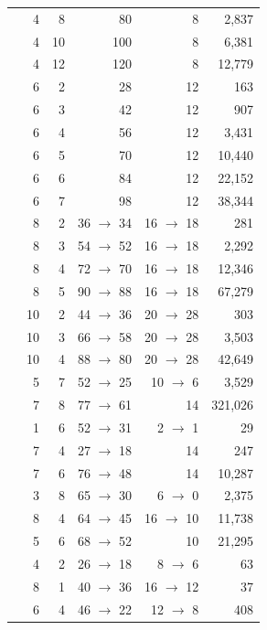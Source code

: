 \begin{longtable}{@{}L{4.4cm} r r r r r@{}}
\addlinespace[2pt]
 & 4 & 8 & 80 & 8 & 2,837 \\
 & 4 & 10 & 100 & 8 & 6,381 \\
 & 4 & 12 & 120 & 8 & 12,779 \\
 & 6 & 2 & 28 & 12 & 163 \\
 & 6 & 3 & 42 & 12 & 907 \\
 & 6 & 4 & 56 & 12 & 3,431 \\
 & 6 & 5 & 70 & 12 & 10,440 \\
 & 6 & 6 & 84 & 12 & 22,152 \\
 & 6 & 7 & 98 & 12 & 38,344 \\
 & 8 & 2 & 36 $\to$ 34 & 16 $\to$ 18 & 281 \\
 & 8 & 3 & 54 $\to$ 52 & 16 $\to$ 18 & 2,292 \\
 & 8 & 4 & 72 $\to$ 70 & 16 $\to$ 18 & 12,346 \\
 & 8 & 5 & 90 $\to$ 88 & 16 $\to$ 18 & 67,279 \\
 & 10 & 2 & 44 $\to$ 36 & 20 $\to$ 28 & 303 \\
 & 10 & 3 & 66 $\to$ 58 & 20 $\to$ 28 & 3,503 \\
 & 10 & 4 & 88 $\to$ 80 & 20 $\to$ 28 & 42,649 \\
 & 5 & 7 & 52 $\to$ 25 & 10 $\to$ 6 & 3,529 \\
 & 7 & 8 & 77 $\to$ 61 & 14 & 321,026 \\
 & 1 & 6 & 52 $\to$ 31 & 2 $\to$ 1 & 29 \\
 & 7 & 4 & 27 $\to$ 18 & 14 & 247 \\
 & 7 & 6 & 76 $\to$ 48 & 14 & 10,287 \\
 & 3 & 8 & 65 $\to$ 30 & 6 $\to$ 0 & 2,375 \\
 & 8 & 4 & 64 $\to$ 45 & 16 $\to$ 10 & 11,738 \\
 & 5 & 6 & 68 $\to$ 52 & 10 & 21,295 \\
 & 4 & 2 & 26 $\to$ 18 & 8 $\to$ 6 & 63 \\
 & 8 & 1 & 40 $\to$ 36 & 16 $\to$ 12 & 37 \\
 & 6 & 4 & 46 $\to$ 22 & 12 $\to$ 8 & 408 \\

\end{longtable}
